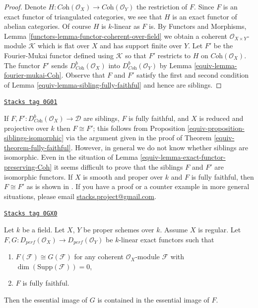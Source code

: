 \begin{proof}

Denote $H : \textit{Coh}(\mathcal{O}_X) \to \textit{Coh}(\mathcal{O}_Y)$
the restriction of $F$. Since $F$ is an exact functor of triangulated
categories, we see that $H$ is an exact functor of abelian categories.
Of course $H$ is $k$-linear as $F$ is. By
Functors and Morphisms, Lemma \ref{functors-lemma-functor-coherent-over-field}
we obtain a coherent $\mathcal{O}_{X \times Y}$-module
$\mathcal{K}$ which is flat over $X$ and has support finite over $Y$.
Let $F'$ be the Fourier-Mukai functor defined using $\mathcal{K}$
so that $F'$ restricts to $H$ on $ \textit{Coh}(\mathcal{O}_X)$.
The functor $F'$ sends $D^b_{\textit{Coh}}(\mathcal{O}_X)$
into $D^b_{\textit{Coh}}(\mathcal{O}_Y)$ by
Lemma \ref{equiv-lemma-fourier-mukai-Coh}.
Observe that $F$ and $F'$ satisfy the first and second
condition of Lemma \ref{equiv-lemma-sibling-fully-faithful} and hence are siblings.
\end{proof}

\begin{remark}[Difficult]
\label{equiv-remark-difficult}
\href{https://stacks.math.columbia.edu/tag/0G01}{\texttt{Stacks tag 0G01}}

If $F, F' : D^b_{\textit{Coh}}(\mathcal{O}_X) \to \mathcal{D}$ are siblings, $F$
is fully faithful, and $X$ is reduced and projective over $k$ then
$F \cong F'$; this follows from
Proposition \ref{equiv-proposition-siblings-isomorphic} via the argument
given in the proof of Theorem \ref{equiv-theorem-fully-faithful}.
However, in general we do not know whether siblings are isomorphic.
Even in the situation of Lemma \ref{equiv-lemma-exact-functor-preserving-Coh}
it seems difficult to prove that the siblings $F$ and $F'$
are isomorphic functors. If $X$ is smooth and proper over $k$
and $F$ is fully faithful, then $F \cong F'$ as is shown in
\cite{Noah}.
If you have a proof or a counter example in more general situations,
please email
\href{mailto:stacks.project@gmail.com}{stacks.project@gmail.com}.
\end{remark}

\begin{lemma}
\label{equiv-lemma-two-functors-pre}
\href{https://stacks.math.columbia.edu/tag/0GX0}{\texttt{Stacks tag 0GX0}}

Let $k$ be a field. Let $X$, $Y$ be proper schemes over $k$. Assume
$X$ is regular. Let
$F, G : D_{perf}(\mathcal{O}_X) \to D_{perf}(\mathcal{O}_Y)$
be $k$-linear exact functors such that
\begin{enumerate}
\item $F(\mathcal{F}) \cong G(\mathcal{F})$ for any coherent
$\mathcal{O}_X$-module $\mathcal{F}$ with $\dim(\text{Supp}(\mathcal{F})) = 0$,
\item $F$ is fully faithful.
\end{enumerate}
Then the essential image of $G$ is contained in the essential
image of $F$.
\end{lemma}

